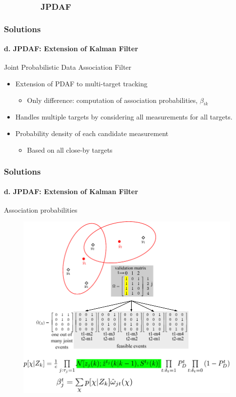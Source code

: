 \documentclass{beamer}
\begin{document}
\subsubsection{\ \ \ \ \ \ \ \ JPDAF }
\begin{frame}
\frametitle{Solutions}
\framesubtitle{d. JPDAF: Extension of Kalman Filter}
\mypagenum
	{\color{red} Joint Probabilistic Data Association Filter}
	\begin{itemize}
		\item Extension of PDAF to multi-target tracking	
			\begin{itemize}
				\item Only difference: computation of association probabilities, $\beta_{ik}$
			\end{itemize}
		\item Handles multiple targets by considering all measurements for all targets.  
		\item Probability density of each candidate measurement
			\begin{itemize}
				\item Based on all close-by targets
			\end{itemize}
	\end{itemize}
\end{frame}




\begin{frame}
\frametitle{Solutions}
\framesubtitle{d. JPDAF: Extension of Kalman Filter}
\mypagenum 	
Association probabilities
	\begin{figure}
		\includegraphics[height=0.80\textheight]{figs/TRK_JPDAF_twoTargetScenario.pdf}
	\end{figure}	
\end{frame}
\end{document}
